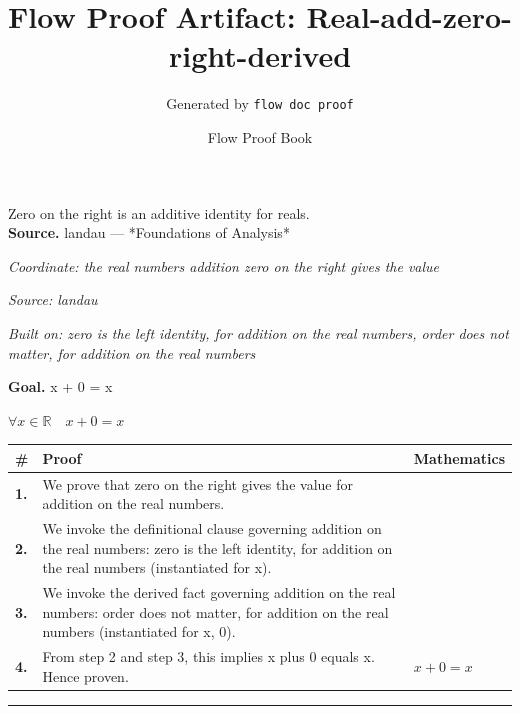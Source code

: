 \documentclass[11pt]{article}
\title{Flow Proof Artifact: Real-add-zero-right-derived}
\author{Generated by \texttt{flow doc proof}}
\date{Flow Proof Book}
\theoremstyle{definition}
\begin{document}
\maketitle
Zero on the right is an additive identity for reals.\\[0.5em]
\textbf{Source.} landau — *Foundations of Analysis*\\[0.5em]
\bigskip
{}\par
\smallskip\noindent\textit{Coordinate: the real numbers \cdot addition \cdot zero on the right gives the value}\par
\smallskip\noindent\textit{Source: landau}\par
\smallskip\noindent\textit{Built on: zero is the left identity, for addition on the real numbers, order does not matter, for addition on the real numbers}\par
\medskip
\noindent\textbf{Goal.} x + 0 = x\par
\noindent$\displaystyle \forall x \in \mathbb{R}\quad x + 0 = x$\par
\medskip
\noindent
\begin{tabular}{@{} >{\raggedright\arraybackslash}p{} >{\raggedright\arraybackslash}p{} >{\raggedleft\arraybackslash}p{} @{}}
\textbf{\#} & \textbf{Proof} & \textbf{Mathematics} \\
\midrule
\textbf{1.} & We prove that zero on the right gives the value for addition on the real numbers. & \\[0.45em]
\textbf{2.} & We invoke the definitional clause governing addition on the real numbers: zero is the left identity, for addition on the real numbers (instantiated for x). & \\[0.45em]
\textbf{3.} & We invoke the derived fact governing addition on the real numbers: order does not matter, for addition on the real numbers (instantiated for x, 0). & \\[0.45em]
\textbf{4.} & From step 2 and step 3, this implies x plus 0 equals x. Hence proven. & $\displaystyle x + 0 = x$ \\[0.45em]
\bottomrule
\end{tabular}
\label{thm:Real-addition-zero_on_the_right_gives_the_value}
\par\medskip\hrule
\end{document}
